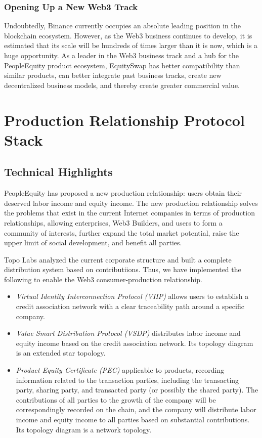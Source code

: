 \documentclass{article}
\begin{document}
\subsubsection{Opening Up a New Web3 Track}

Undoubtedly, Binance currently occupies an absolute leading position in the blockchain ecosystem. However, as the Web3 business continues to develop, it is estimated that its scale will be hundreds of times larger than it is now, which is a huge opportunity. As a leader in the Web3 business track and a hub for the PeopleEquity product ecosystem, EquitySwap has better compatibility than similar products, can better integrate past business tracks, create new decentralized business models, and thereby create greater commercial value.


\section{Production Relationship Protocol Stack}
\subsection{Technical Highlights}
    
PeopleEquity has proposed a new production relationship: users obtain their deserved labor income and equity income. The new production relationship solves the problems that exist in the current Internet companies in terms of production relationships, allowing enterprises, Web3 Builders, and users to form a community of interests, further expand the total market potential, raise the upper limit of social development, and benefit all parties.

Topo Labs analyzed the current corporate structure and built a complete distribution system based on contributiions. Thus, we have implemented the following to enable the Web3 consumer-production relationship.

\begin{itemize}
  \item \emph{Virtual Identity Interconnection Protocol (VIIP)} allows users to establish a credit association network with a clear traceability path around a specific company.
  \item \emph{Value Smart Distribution Protocol (VSDP)} distributes labor income and equity income based on the credit association network. Its topology diagram is an extended star topology.
  \item \emph{Product Equity Certificate (PEC)} applicable to products, recording information related to the transaction parties, including the transacting party, sharing party, and transacted party (or possibly the shared party). The contributions of all parties to the growth of the company will be correspondingly recorded on the chain, and the company will distribute labor income and equity income to all parties based on substantial contributions. Its topology diagram is a network topology. 
\end{itemize}
\end{document}
